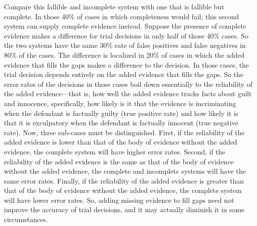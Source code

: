 \documentclass[
  10pt,
  dvipsnames,enabledeprecatedfontcommands]{scrartcl}
\begin{document}
Compare this fallible and incomplete system with one that is fallible
but complete. In those 40\% of cases in which completeness would fail,
this second system can supply complete evidence instead. Suppose the
presence of complete evidence makes a difference for trial decisions in
only half of those 40\% cases. So the two systems have the same 30\%
rate of false positives and false negatives in 80\% of the cases. The
difference is localized in 20\% of cases in which the added evidence
that fills the gaps makes a difference to the decision. In those cases,
the trial decision depends entirely on the added evidence that fills the
gaps. So the error rates of the decisions in those cases boil down
essentially to the reliability of the added evidence---that is, how well
the added evidence tracks facts about guilt and innocence, specifically,
how likely is it that the evidence is incriminating when the defendant
is factually guilty (true positive rate) and how likely it is that it is
exculpatory when the defendant is factually innocent (true negative
rate). Now, three sub-cases must be distinguished. First, if the
reliability of the added evidence is lower than that of the body of
evidence without the added evidence, the complete system will have
higher error rates. Second, if the reliability of the added evidence is
the same as that of the body of evidence without the added evidence, the
complete and incomplete systems will have the same error rates. Finally,
if the reliability of the added evidence is greater than that of the
body of evidence without the added evidence, the complete system will
have lower error rates. So, adding missing evidence to fill gaps need
not improve the accuracy of trial decisions, and it may actually
diminish it in some circumstances.
\end{document}
